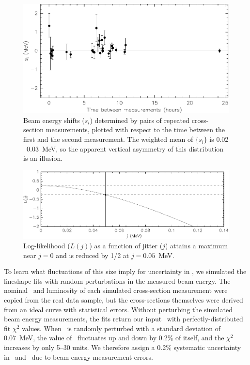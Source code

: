 \documentclass{cornell}
\begin{document}
\begin{figure}[p]
  \begin{center}
    \includegraphics[width=\linewidth]{plots/miscalhours}
  \end{center}
  \caption[Calibration shifts from repeated cross-section
  measurements]{\label{miscalhours} Beam energy shifts ($s_i$)
  determined by pairs of repeated cross-section measurements, plotted
  with respect to the time between the first and the second
  measurement.  The weighted mean of $\{s_i\}$ is 0.02 \PM\ 0.03~MeV,
  so the apparent vertical asymmetry of this distribution is an
  illusion.}
\end{figure}

\begin{figure}[p]
  \begin{center}
    \includegraphics[width=\linewidth]{newplots/energylj}
  \end{center}
  \caption[Log-likelihood of beam energy jitter]{\label{energylj}
  Log-likelihood ($L(j)$) as a function of jitter ($j$) attains a
  maximum near $j=0$ and is reduced by 1/2 at $j=0.05$~MeV.}
\end{figure}

To learn what fluctuations of this size imply for uncertainty in
\geehadtot, we simulated the lineshape fits with random perturbations
in the measured beam energy.  The nominal \ecm\ and luminosity of each
simulated cross-section measurement were copied from the real data
sample, but the cross-sections themselves were derived from an ideal
curve with statistical errors.  Without perturbing the simulated beam
energy measurements, the fits return our input \geehadtot\ with
perfectly-distributed fit $\chi^2$ values.  When \ecm\ is randomly
perturbed with a standard deviation of 0.07~MeV, the value of
\geehadtot\ fluctuates up and down by 0.2\% of itself, and the
$\chi^2$ increases by only 5--30 units.  \label{pag:notjitter} We
therefore assign a 0.2\% systematic uncertainty in \geehadtot\ and
\gee\ due to beam energy measurement errors.
\end{document}

